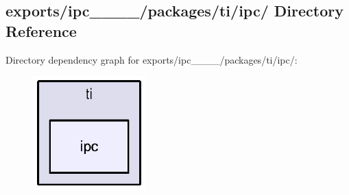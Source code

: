 \subsection{exports/ipc\-\_\-\_\-\_\-\_/packages/ti/ipc/ Directory Reference}
\label{dir_d79a042dad10b03eb0064292f0e1fe58}
Directory dependency graph for exports/ipc\-\_\-\_\-\_\-\_/packages/ti/ipc/\-:
\nopagebreak
\begin{figure}[H]
\begin{center}
\leavevmode
\includegraphics[width=123pt]{dir_d79a042dad10b03eb0064292f0e1fe58_dep}
\end{center}
\end{figure}
